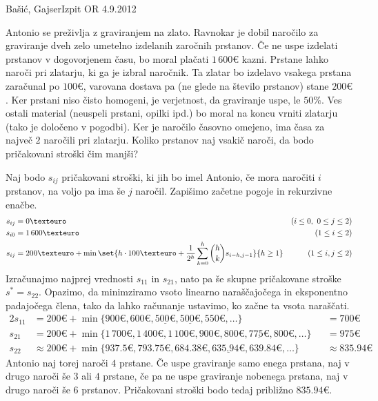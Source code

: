 \begin{naloga}{Bašić, Gajser}{Izpit OR 4.9.2012}
\begin{vprasanje}
Antonio se preživlja z graviranjem na zlato.
Ravnokar je dobil naročilo za graviranje
dveh zelo umetelno izdelanih zaročnih prstanov.
Če ne uspe izdelati prstanov v dogovorjenem času,
bo moral plačati $1\,600 €$ kazni.
Prstane lahko naroči pri zlatarju, ki ga je izbral naročnik.
Ta zlatar bo izdelavo vsakega prstana zaračunal po $100 €$,
varovana dostava pa (ne glede na število prstanov) stane $200 €$.
Ker prstani niso čisto homogeni,
je verjetnost, da graviranje uspe, le $50 \%$.
Ves ostali material (neuspeli prstani, opilki ipd.)
bo moral na koncu vrniti zlatarju (tako je določeno v pogodbi).
Ker je naročilo časovno omejeno, ima časa za največ $2$ naročili pri zlatarju.
Koliko prstanov naj vsakič naroči, da bodo pričakovani stroški čim manjši?
\end{vprasanje}

\begin{odgovor}
Naj bodo $s_{ij}$ pričakovani stroški, ki jih bo imel Antonio,
če mora naročiti $i$ prstanov, na voljo pa ima še $j$ naročil.
Zapišimo začetne pogoje in rekurzivne enačbe.
\begin{align*}
s_{ij} &= 0 € & (i \le 0, \ 0 \le j \le 2) \\
s_{i0} &= 1\,600 € & (1 \le i \le 2) \\
s_{ij} &= 200 € + \min\set{h \cdot 100 € + {1 \over 2^h} \sum_{k=0}^h {h \choose k} s_{i-h, j-1}}{h \ge 1} & (1 \le i, j \le 2)
\end{align*}
Izračunajmo najprej vrednosti $s_{11}$ in $s_{21}$,
nato pa še skupne pričakovane stroške $s^* = s_{22}$.
Opazimo, da minimziramo vsoto
linearno naraščajočega in eksponentno padajočega člena,
tako da lahko računanje ustavimo, ko začne ta vsota naraščati.
\begin{alignat*}{2}
s_{11} &= 200 € + \min\{900 €, 600 €, \underline{500 €}, \underline{500 €}, 550 €, \dots\} &&= 700 € \\
s_{21} &= 200 € + \min\{1\,700 €, 1\,400 €, 1\,100 €, 900 €, 800 €, \underline{775 €}, 800 €, \dots\} &&= 975 € \\
s_{22} &\approx 200€ + \min\{937.5 €, 793.75 €, 684.38 €, \underline{635.94 €}, 639.84 €, \dots\} &&\approx 835.94 €
\end{alignat*}
Antonio naj torej naroči $4$ prstane.
Če uspe graviranje samo enega prstana,
naj v drugo naroči še $3$ ali $4$ prstane,
če pa ne uspe graviranje nobenega prstana,
naj v drugo naroči še $6$ prstanov.
Pričakovani stroški bodo tedaj približno $835.94 €$.
\end{odgovor}
\end{naloga}
